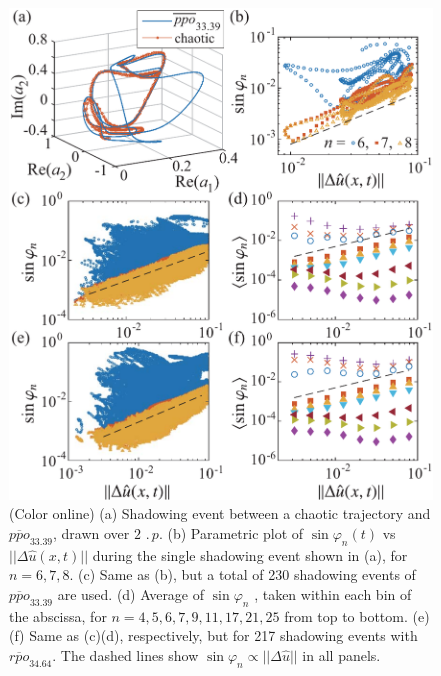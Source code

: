 \documentclass[prl,aps,preprint,showpacs,superscriptaddress]{revtex4-1} %
\begin{document}
\begin{figure}[t]
  \centering
 \includegraphics[width=\hsize,clip]{ks22vecShadow}
  \caption{
(Color online)
(a) Shadowing event between a chaotic trajectory and $\overline{ppo}_{33.39}$,
drawn over $2\,\period{p}$.
(b) Parametric plot of $\sin\varphi_n(t)$ vs $||\Delta\hat{u}(x,t)||$
 during the single shadowing event shown in (a), for $n=6,7,8$.
(c) Same as (b), but a total of 230 shadowing events of $\overline{ppo}_{33.39}$ are used.
(d) Average of $\sin\varphi_n$ ,
 taken within each bin of the abscissa,
 for $n=4,5,6,7,9,11,17,21,25$ from top to bottom.
(e)(f) Same as (c)(d), respectively,
 but for 217 shadowing events with $\overline{rpo}_{34.64}$.
The dashed lines show $\sin\varphi_n\propto||\Delta\hat{u}||$ in all panels.
 }
  \label{fig:ks22vecShadow}
\end{figure}
\end{document}
